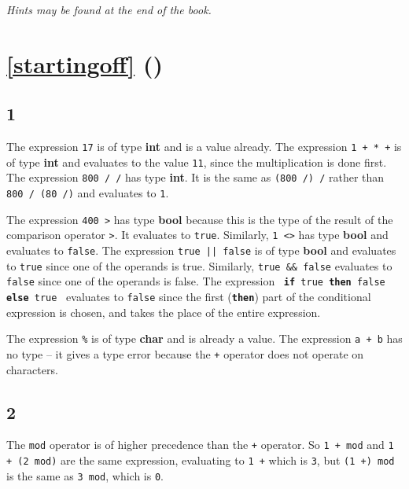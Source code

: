 \documentclass[]{book}
\newcommand\upquote[1]{\textquotesingle#1\textquotesingle}
\begin{document}
\textit{Hints may be found at the end of the book.}

\section*{\ref{startingoff} ()}
\subsection*{1}

The expression \texttt{17} is of type \textrm{\textbf{int}} and is a value already. The expression \texttt{1\! +\! *\! +} is of type \textrm{\textbf{int}} and evaluates to the value \texttt{11}, since the multiplication is done first. The expression \texttt{800\! /\! /} has type \textrm{\textbf{int}}. It is the same as \texttt{(800\! /)\! /} rather than \texttt{800\! /\! (80\! /)} and evaluates to \texttt{1}.

The expression \texttt{400\! >} has type \textrm{\textbf{bool}} because this is the type of the result of the comparison operator \texttt{>}. It evaluates to \texttt{true}. Similarly, \texttt{1\! <>} has type \textrm{\textbf{bool}} and evaluates to \texttt{false}. The expression \texttt{true\! ||\! false} is of type \textbf{\textrm{bool}} and evaluates to \texttt{true} since one of the operands is true. Similarly, \texttt{true\! \&\&\! false} evaluates to \texttt{false} since one of the operands is false. The expression \ \texttt{\textbf{if}\! true\! \textbf{then}\! false\! \textbf{else}\! true} \ evaluates to \texttt{false} since the first (\texttt{\textbf{then}}) part of the conditional expression is chosen, and takes the place of the entire expression.

The expression \texttt{\upquote{\%}} is of type \textbf{\textrm{char}} and is already a value. The expression \texttt{\upquote{a}\! +\! \upquote{b}} has no type -- it gives a type error because the \texttt{+} operator does not operate on characters.

\subsection*{2}
The \texttt{mod} operator is of higher precedence than the \texttt{+} operator. So \texttt{1\! +\! mod} and \texttt{1\! +\! (2\! mod)} are the same expression, evaluating to \texttt{1\! +} which is \texttt{3}, but \texttt{(1\! +)\! mod} is the same as \texttt{3\! mod}, which is \texttt{0}.
\end{document}
